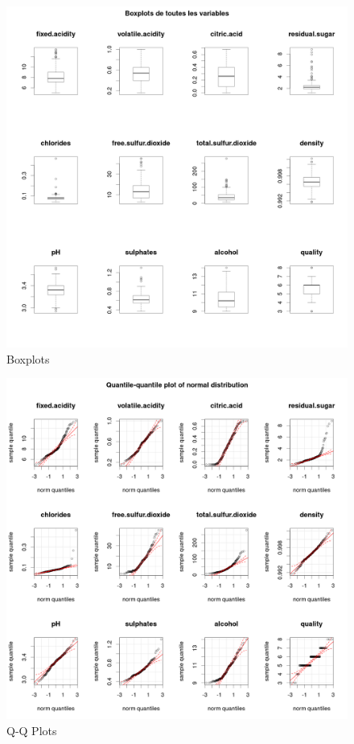 \documentclass[11pt,a4paper]{article}
\begin{document}
\begin{figure}


\includegraphics[width=\textwidth,keepaspectratio]{"boxplot"}
\caption{Boxplots}
\label{fig:boxplot}
\end{figure}
\begin{figure}

	\includegraphics[width=\textwidth,keepaspectratio]{"qqplot"}
	
	\caption{Q-Q Plots}
	\label{fig:qqplot}
\end{figure}
\end{document}
